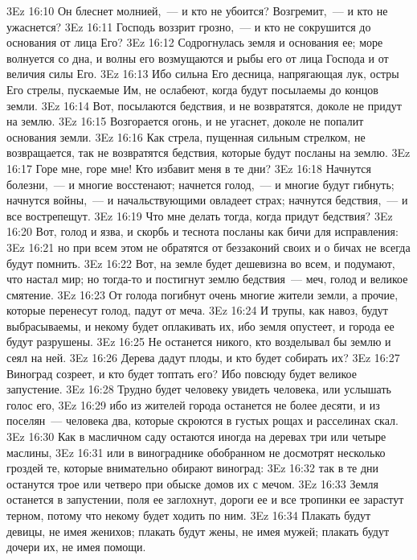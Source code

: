 \vs 3Ez 16:10 Он блеснет молнией,~--- и кто не убоится? Возгремит,~--- и кто не ужаснется?
\vs 3Ez 16:11 Господь воззрит грозно,~--- и кто не сокрушится до основания от лица Его?
\vs 3Ez 16:12 Содрогнулась земля и основания ее; море волнуется со дна, и волны его возмущаются и рыбы его от лица Господа и от величия силы Его.
\vs 3Ez 16:13 Ибо сильна Его десница, напрягающая лук, остры Его стрелы, пускаемые Им, не ослабеют, когда будут посылаемы до концов земли.
\vs 3Ez 16:14 Вот, посылаются бедствия, и не возвратятся, доколе не придут на землю.
\vs 3Ez 16:15 Возгорается огонь, и не угаснет, доколе не попалит основания земли.
\vs 3Ez 16:16 Как стрела, пущенная сильным стрелком, не возвращается, так не возвратятся бедствия, которые будут посланы на землю.
\vs 3Ez 16:17 Горе мне, горе мне! Кто избавит меня в те дни?
\vs 3Ez 16:18 Начнутся болезни,~--- и многие восстенают; начнется голод,~--- и многие будут гибнуть; начнутся войны,~--- и начальствующими овладеет страх; начнутся бедствия,~--- и все вострепещут.
\vs 3Ez 16:19 Что мне делать тогда, когда придут бедствия?
\vs 3Ez 16:20 Вот, голод и язва, и скорбь и теснота посланы как бичи для исправления:
\vs 3Ez 16:21 но при всем этом  не обратятся от беззаконий своих и о бичах не всегда будут помнить.
\vs 3Ez 16:22 Вот, на земле будет дешевизна во всем, и подумают, что настал мир; но тогда-то и постигнут землю бедствия~--- меч, голод и великое смятение.
\vs 3Ez 16:23 От голода погибнут очень многие жители земли, а прочие, которые перенесут голод, падут от меча.
\vs 3Ez 16:24 И трупы, как навоз, будут выбрасываемы, и некому будет оплакивать их, ибо земля опустеет, и города ее будут разрушены.
\vs 3Ez 16:25 Не останется никого, кто возделывал бы землю и сеял на ней.
\vs 3Ez 16:26 Дерева дадут плоды, и кто будет собирать их?
\vs 3Ez 16:27 Виноград созреет, и кто будет топтать его? Ибо повсюду будет великое запустение.
\vs 3Ez 16:28 Трудно будет человеку увидеть человека, или услышать голос его,
\vs 3Ez 16:29 ибо из жителей города останется не более десяти, и из поселян~--- человека два, которые скроются в густых рощах и расселинах скал.
\vs 3Ez 16:30 Как в масличном саду остаются иногда на деревах три или четыре маслины,
\vs 3Ez 16:31 или в винограднике обобранном не досмотрят несколько гроздей те, которые внимательно обирают виноград:
\vs 3Ez 16:32 так в те дни останутся трое или четверо при обыске домов их с мечом.
\vs 3Ez 16:33 Земля останется в запустении, поля ее заглохнут, дороги ее и все тропинки ее зарастут терном, потому что некому будет ходить по ним.
\vs 3Ez 16:34 Плакать будут девицы, не имея женихов; плакать будут жены, не имея мужей; плакать будут дочери их, не имея помощи.
